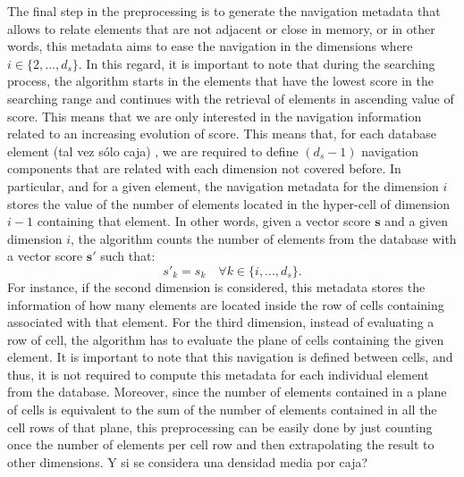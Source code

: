 \documentclass[preprint,12pt]{elsarticle}
\begin{document}
The final step in the preprocessing is to generate the navigation metadata that allows to relate elements that are not adjacent or close in memory, or in other words, this metadata aims to ease the navigation in the dimensions where $i\in\{2,\dots,d_s\}$. In this regard, it is important to note that during the searching process, the algorithm starts in the elements that have the lowest score in the searching range and continues with the retrieval of elements in ascending value of score. This means that we are only interested in the navigation information related to an increasing evolution of score. This means that, for each database element \color{red} (tal vez s\'olo caja)  \color{black}, we are required to define $(d_s-1)$ navigation components that are related with each dimension not covered before. In particular, and for a given element, the navigation metadata for the dimension $i$ stores the value of the number of elements located in the hyper-cell of dimension $i-1$ containing that element. In other words, given a vector score $\mathbf{s}$ and a given dimension $i$, the algorithm counts the number of elements from the database with a vector score $\mathbf{s'}$ such that:
\begin{equation}\label{eq:navscore}
s'_k = s_k \quad \forall  k \in\{i,...,d_s\}.
\end{equation}
For instance, if the second dimension is considered, this metadata stores the information of how many elements are located inside the row of cells containing associated with that element. For the third dimension, instead of evaluating a row of cell, the algorithm has to evaluate the plane of cells containing the given element. It is important to note that this navigation is defined between cells, and thus, it is not required to compute this metadata for each individual element from the database. Moreover, since the number of elements contained in a plane of cells is equivalent to the sum of the number of elements contained in all the cell rows of that plane, this preprocessing can be easily done by just counting once the number of elements per cell row and then extrapolating the result to other dimensions. \color{red} \textquestiondown Y si se considera una densidad media por caja? \color{black}
\end{document}
